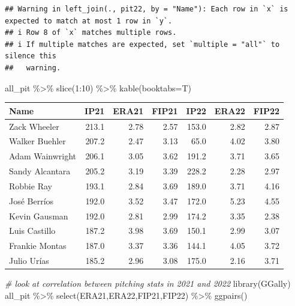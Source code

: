 \documentclass[
  11pt,
]{book}
\newenvironment{Shaded}{\begin{snugshade}}{\end{snugshade}}
\newcommand{\AttributeTok}[1]{\textcolor[rgb]{0.77,0.63,0.00}{#1}}
\newcommand{\CommentTok}[1]{\textcolor[rgb]{0.56,0.35,0.01}{\textit{#1}}}
\newcommand{\DecValTok}[1]{\textcolor[rgb]{0.00,0.00,0.81}{#1}}
\newcommand{\FunctionTok}[1]{\textcolor[rgb]{0.00,0.00,0.00}{#1}}
\newcommand{\NormalTok}[1]{#1}
\newcommand{\SpecialCharTok}[1]{\textcolor[rgb]{0.00,0.00,0.00}{#1}}
\theoremstyle{definition}
\theoremstyle{definition}
\theoremstyle{definition}
\theoremstyle{definition}
\theoremstyle{remark}
\begin{document}
\begin{verbatim}
## Warning in left_join(., pit22, by = "Name"): Each row in `x` is expected to match at most 1 row in `y`.
## i Row 8 of `x` matches multiple rows.
## i If multiple matches are expected, set `multiple = "all"` to silence this
##   warning.
\end{verbatim}

\begin{Shaded}
\begin{Highlighting}[]
\NormalTok{all\_pit }\SpecialCharTok{\%\textgreater{}\%} \FunctionTok{slice}\NormalTok{(}\DecValTok{1}\SpecialCharTok{:}\DecValTok{10}\NormalTok{) }\SpecialCharTok{\%\textgreater{}\%} \FunctionTok{kable}\NormalTok{(}\AttributeTok{booktabs=}\NormalTok{T)}
\end{Highlighting}
\end{Shaded}

\begin{tabular}{lrrrrrr}
\toprule
Name & IP21 & ERA21 & FIP21 & IP22 & ERA22 & FIP22\\
\midrule
Zack Wheeler & 213.1 & 2.78 & 2.57 & 153.0 & 2.82 & 2.87\\
Walker Buehler & 207.2 & 2.47 & 3.13 & 65.0 & 4.02 & 3.80\\
Adam Wainwright & 206.1 & 3.05 & 3.62 & 191.2 & 3.71 & 3.65\\
Sandy Alcantara & 205.2 & 3.19 & 3.39 & 228.2 & 2.28 & 2.97\\
Robbie Ray & 193.1 & 2.84 & 3.69 & 189.0 & 3.71 & 4.16\\
\addlinespace
José Berríos & 192.0 & 3.52 & 3.47 & 172.0 & 5.23 & 4.55\\
Kevin Gausman & 192.0 & 2.81 & 2.99 & 174.2 & 3.35 & 2.38\\
Luis Castillo & 187.2 & 3.98 & 3.69 & 150.1 & 2.99 & 3.07\\
Frankie Montas & 187.0 & 3.37 & 3.36 & 144.1 & 4.05 & 3.72\\
Julio Urías & 185.2 & 2.96 & 3.08 & 175.0 & 2.16 & 3.71\\
\bottomrule
\end{tabular}

\newpage

\begin{Shaded}
\begin{Highlighting}[]
\CommentTok{\# look at correlation between pitching stats in 2021 and 2022}
\FunctionTok{library}\NormalTok{(GGally)}
\NormalTok{all\_pit }\SpecialCharTok{\%\textgreater{}\%} \FunctionTok{select}\NormalTok{(ERA21,ERA22,FIP21,FIP22) }\SpecialCharTok{\%\textgreater{}\%} \FunctionTok{ggpairs}\NormalTok{()}
\end{Highlighting}
\end{Shaded}
\end{document}
